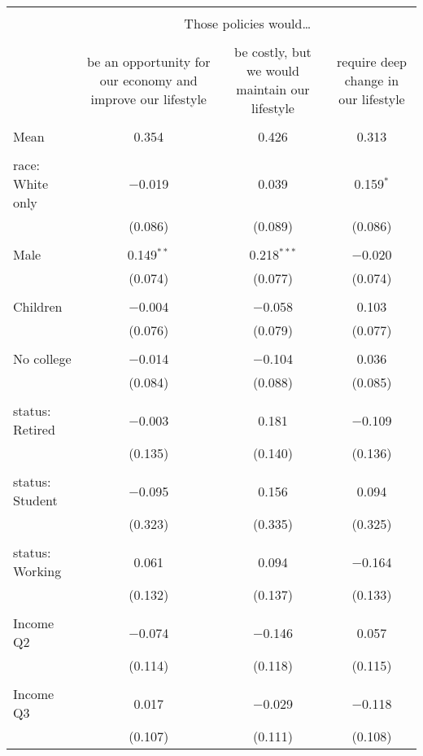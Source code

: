 
\begin{tabular}{@{\extracolsep{5pt}}lccc} 
\\[-1.8ex]\hline 
\hline \\[-1.8ex] 
 & \multicolumn{3}{c}{Those policies would…} \\ 
\cline{2-4} 
\\[-1.8ex] & be an opportunity for our economy and improve our lifestyle & be costly, but we would maintain our lifestyle & require deep change in our lifestyle \\ 
\hline \\[-1.8ex] 
 Mean & 0.354 & 0.426 & 0.313  \\ \hline \\[-1.8ex] race: White only & $-$0.019 & 0.039 & 0.159$^{*}$ \\ 
  & (0.086) & (0.089) & (0.086) \\ 
  & & & \\ 
 Male & 0.149$^{**}$ & 0.218$^{***}$ & $-$0.020 \\ 
  & (0.074) & (0.077) & (0.074) \\ 
  & & & \\ 
 Children & $-$0.004 & $-$0.058 & 0.103 \\ 
  & (0.076) & (0.079) & (0.077) \\ 
  & & & \\ 
 No college & $-$0.014 & $-$0.104 & 0.036 \\ 
  & (0.084) & (0.088) & (0.085) \\ 
  & & & \\ 
 status: Retired & $-$0.003 & 0.181 & $-$0.109 \\ 
  & (0.135) & (0.140) & (0.136) \\ 
  & & & \\ 
 status: Student & $-$0.095 & 0.156 & 0.094 \\ 
  & (0.323) & (0.335) & (0.325) \\ 
  & & & \\ 
 status: Working & 0.061 & 0.094 & $-$0.164 \\ 
  & (0.132) & (0.137) & (0.133) \\ 
  & & & \\ 
 Income Q2 & $-$0.074 & $-$0.146 & 0.057 \\ 
  & (0.114) & (0.118) & (0.115) \\ 
  & & & \\ 
 Income Q3 & 0.017 & $-$0.029 & $-$0.118 \\ 
  & (0.107) & (0.111) & (0.108) \\ 

\end{tabular}
